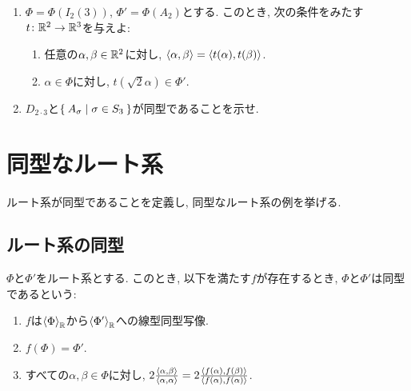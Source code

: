 \begin{enumerate}
\item
  $\Phi=\Phi(I_2(3))$,
  $\Phi'=\Phi(A_2)$とする.
  このとき,
  次の条件をみたす$t\colon \mathbb{R}^2\to \mathbb{R}^3$を与えよ:
  \begin{enumerate}
    \item 任意の$\alpha,\beta\in \mathbb{R}^2$に対し, $\Braket{\alpha,\beta}=\Braket{t(\alpha),t(\beta)}$.
    \item $\alpha\in\Phi$に対し, $ t(\sqrt{2}\alpha)\in \Phi'$.
  \end{enumerate}
\item $D_{2\cdot 3}$と$\Set{A_\sigma|\sigma\in S_3}$が同型であることを示せ.
\end{enumerate}

\chapter{同型なルート系}
ルート系が同型であることを定義し,
同型なルート系の例を挙げる.
\section{ルート系の同型}

\begin{definition}
  $\Phi$と$\Phi'$をルート系とする.
  このとき,
  以下を満たす$f$が存在するとき,
  $\Phi$と$\Phi'$は同型であるという:
  \begin{enumerate}
  \item $f$は$\Braket{\Phi}_{\mathbb{R}}$から$\Braket{\Phi'}_{\mathbb{R}}$への線型同型写像.
  \item $f(\Phi) = \Phi'$.
  \item すべての$\alpha, \beta\in \Phi$に対し,
    $2\frac{\Braket{\alpha,\beta}}{\Braket{\alpha,\alpha}}=2\frac{\Braket{f(\alpha),f(\beta)}}{\Braket{f(\alpha),f(\alpha)}}$.
  \end{enumerate}
\end{definition}

